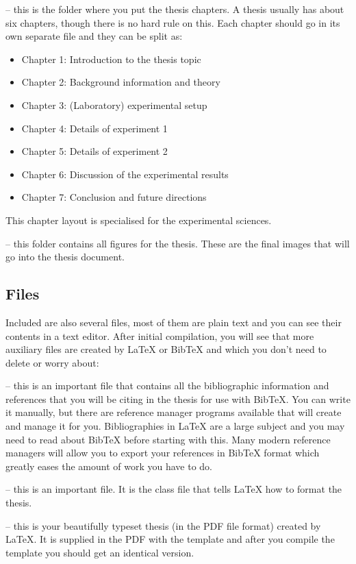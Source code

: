 -- this is the folder where you put the thesis chapters. A thesis usually has about six chapters, though there is no hard rule on this. Each chapter should go in its own separate  file and they can be split as:
\begin{itemize}
\item Chapter 1: Introduction to the thesis topic
\item Chapter 2: Background information and theory
\item Chapter 3: (Laboratory) experimental setup
\item Chapter 4: Details of experiment 1
\item Chapter 5: Details of experiment 2
\item Chapter 6: Discussion of the experimental results
\item Chapter 7: Conclusion and future directions
\end{itemize}
This chapter layout is specialised for the experimental sciences.

 -- this folder contains all figures for the thesis. These are the final images that will go into the thesis document.

\subsection{Files}

Included are also several files, most of them are plain text and you can see their contents in a text editor. After initial compilation, you will see that more auxiliary files are created by \LaTeX{} or BibTeX and which you don't need to delete or worry about:

 -- this is an important file that contains all the bibliographic information and references that you will be citing in the thesis for use with BibTeX. You can write it manually, but there are reference manager programs available that will create and manage it for you. Bibliographies in \LaTeX{} are a large subject and you may need to read about BibTeX before starting with this. Many modern reference managers will allow you to export your references in BibTeX format which greatly eases the amount of work you have to do.

 -- this is an important file. It is the class file that tells \LaTeX{} how to format the thesis. 

 -- this is your beautifully typeset thesis (in the PDF file format) created by \LaTeX{}. It is supplied in the PDF with the template and after you compile the template you should get an identical version.

